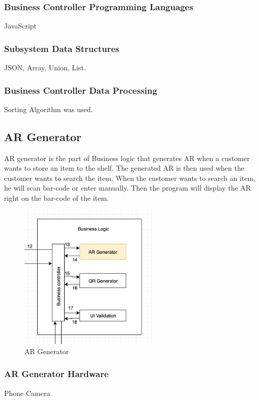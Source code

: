 \subsubsection{Business Controller Programming Languages}
JavaScript

\subsubsection{Subsystem Data Structures}
JSON, Array, Union, List.

\subsubsection{Business Controller Data Processing}
Sorting Algorithm was used.

\subsection{AR Generator}
AR generator is the part of Business logic that generates AR when a customer wants to store an item to the shelf. The generated AR is then used when the customer wants to search the item. When the customer wants to search an item, he will scan bar-code or enter manually. Then the program will display the AR right on the bar-code of the item.
\begin{figure}[h!]
	\centering
 	\includegraphics[width=0.60\textwidth]{images/argenerator}
 \caption{AR Generator}
\end{figure}

\subsubsection{AR Generator Hardware}
Phone Camera

